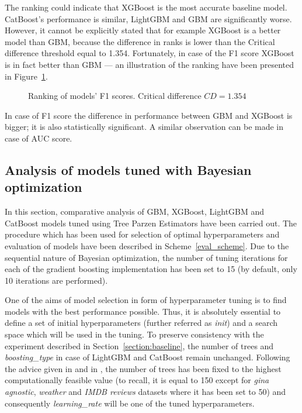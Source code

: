 \documentclass[magisterska, english]{pwr_wmat_praca_dyplomowa}
\theoremstyle{plain}
\numberwithin{theorem}{chapter}
\theoremstyle{definition}
\numberwithin{theorem}{chapter}
\begin{document}
The ranking could indicate that XGBoost is the most accurate baseline model. CatBoost's performance is similar, LightGBM and GBM are significantly worse. However, it cannot be explicitly stated that for example XGBoost is a better model than GBM, because the difference in ranks is lower than the Critical difference threshold equal to 1.354. Fortunately, in case of the F1 score XGBoost is in fact better than GBM --- an illustration of the ranking have been presented in Figure~\ref{fig:no_tuning_F1_heatmap}.

\begin{figure}[H]
	\centering
	\caption{Ranking of models' F1 scores. Critical difference $CD = 1.354$}
	\label{fig:no_tuning_F1_heatmap}
\end{figure}

In case of F1 score the difference in performance between GBM and XGBoost is bigger; it is also statistically significant. A similar observation can be made in case of AUC score.

\subsection{Analysis of models tuned with Bayesian optimization}\label{section_tpe}
In this section, comparative analysis of GBM, XGBoost, LightGBM and CatBoost models tuned using Tree Parzen Estimators have been carried out. The procedure which has been used for selection of optimal hyperparameters and evaluation of models have been described in Scheme~\ref{eval_scheme}. Due to the sequential nature of Bayesian optimization, the number of tuning iterations for each of the gradient boosting implementation has been set to 15 (by default, only 10 iterations are performed).

One of the aims of model selection in form of hyperparameter tuning is to find models with the best performance possible. Thus, it is absolutely essential to define a set of initial hyperparameters (further referred as \emph{init}) and a search space which will be used in the tuning. To preserve consistency with the experiment described in Section~\ref{section:baseline}, the number of trees and \emph{boosting\_type} in case of LightGBM and CatBoost remain unchanged. Following the advice given in \cite{comparative_analysis} and in \cite{friedman_gbm}, the number of trees has been fixed to the highest computationally feasible value (to recall, it is equal to 150 except for \emph{gina agnostic}, \emph{weather} and \emph{IMDB reviews} datasets where it has been set to 50) and consequently \emph{learning\_rate} will be one of the tuned hyperparameters.
\end{document}
